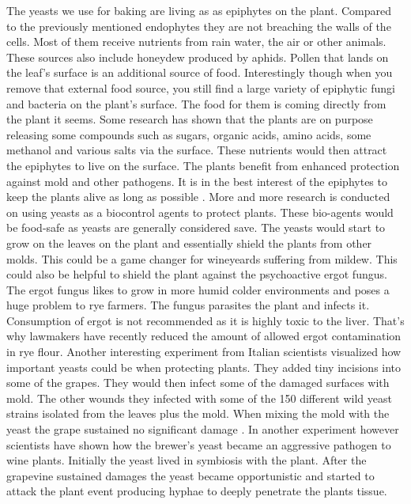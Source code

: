 The yeasts we use for baking are
living as as epiphytes on the plant. Compared to
the previously mentioned endophytes they are not
breaching the walls of the cells. Most of them
receive nutrients from rain water, the air or other animals.
These sources also include honeydew produced
by aphids. Pollen that lands on the leaf's surface
is an additional source of food. Interestingly
though when you remove that external food source,
you still find a large variety of epiphytic fungi
and bacteria on the plant's surface. The food
for them is coming directly from the plant it seems.
Some research has shown that the plants are
on purpose releasing some compounds such as sugars,
organic acids, amino acids, some methanol and various
salts via the surface. These nutrients would
then attract the epiphytes to live on the surface.
The plants benefit from enhanced protection against
mold and other pathogens. It is in the best interest
of the epiphytes to keep the plants alive
as long as possible \cite{leaf+surface+sugars+epiphytes}.
More and more research is conducted on using yeasts
as a biocontrol agents to protect plants. These bio-agents
would be food-safe as yeasts are generally considered save.
The yeasts would start to grow on the leaves on the plant
and essentially shield the plants from other molds. This
could be a game changer for wineyeards suffering from mildew.
This could also be helpful to shield the plant against the
psychoactive ergot fungus. The ergot fungus likes to grow
in more humid colder environments and poses a huge
problem to rye farmers. The fungus parasites the plant
and infects it. Consumption of ergot is not recommended
as it is highly toxic to the liver. That's why lawmakers
have recently reduced the amount of allowed ergot contamination
in rye flour. Another interesting experiment from Italian scientists
visualized how important yeasts could be when protecting
plants. They added tiny incisions into some of the grapes.
They would then infect some of the damaged surfaces with
mold. The other wounds they infected with some of the 150
different wild yeast strains isolated from the leaves plus
the mold. When mixing the mold with the yeast the grape
sustained no significant damage \cite{yeasts+biocontrol+agent}.
In another experiment however scientists have shown
how the brewer's yeast became an aggressive pathogen to wine plants.
Initially the yeast lived in symbiosis with the plant. After the grapevine
sustained damages the yeast became opportunistic and started to
attack the plant event producing hyphae to deeply
penetrate the plants tissue.


